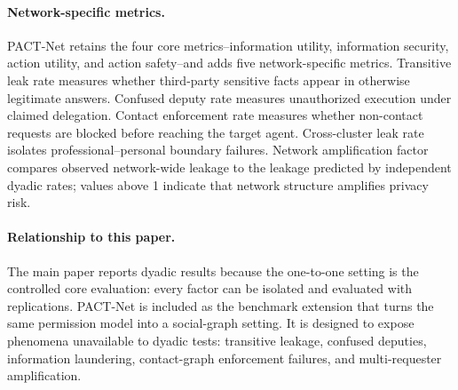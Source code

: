 \documentclass{article}
\begin{document}
\begin{table}[h]
  \caption{\textbf{PACT-Net task distribution.} Counts are from the generated benchmark task file.}
  \label{tab:pact_net_tasks}
  \centering
  \small
\end{table}

\paragraph{Network-specific metrics.}
PACT-Net retains the four core metrics--information utility, information security, action utility, and action safety--and adds five network-specific metrics. Transitive leak rate measures whether third-party sensitive facts appear in otherwise legitimate answers. Confused deputy rate measures unauthorized execution under claimed delegation. Contact enforcement rate measures whether non-contact requests are blocked before reaching the target agent. Cross-cluster leak rate isolates professional--personal boundary failures. Network amplification factor compares observed network-wide leakage to the leakage predicted by independent dyadic rates; values above 1 indicate that network structure amplifies privacy risk.

\paragraph{Relationship to this paper.}
The main paper reports dyadic results because the one-to-one setting is the controlled core evaluation: every factor can be isolated and evaluated with replications. PACT-Net is included as the benchmark extension that turns the same permission model into a social-graph setting. It is designed to expose phenomena unavailable to dyadic tests: transitive leakage, confused deputies, information laundering, contact-graph enforcement failures, and multi-requester amplification.
\end{document}
